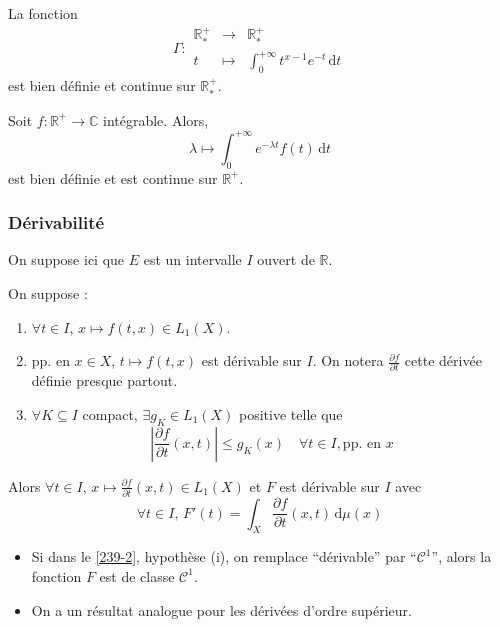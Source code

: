   \begin{example}
    \label{239-1}
    La fonction
    \[ \Gamma :
    \begin{array}{ccc}
      \mathbb{R}^+_* &\rightarrow& \mathbb{R}^+_* \\
      t &\mapsto& \int_{0}^{+\infty} t^{x-1} e^{-t} \, \mathrm{d}t
    \end{array}
    \]
    est bien définie et continue sur $\mathbb{R}^+_*$.
  \end{example}


  \begin{example}
    Soit $f : \mathbb{R}^+ \rightarrow \mathbb{C}$ intégrable. Alors,
    \[ \lambda \mapsto \int_0^{+\infty} e^{-\lambda t} f(t) \, \mathrm{d}t \]
    est bien définie et est continue sur $\mathbb{R}^+$.
  \end{example}

  \subsubsection{Dérivabilité}


  On suppose ici que $E$ est un intervalle $I$ ouvert de $\mathbb{R}$.

  \begin{theorem}
    \label{239-2}
    On suppose :
    \begin{enumerate}[label=(\roman*)]
      \item $\forall t \in I$, $x \mapsto f(t,x) \in L_1(X)$.
      \item pp. en $x \in X$, $t \mapsto f(t,x)$ est dérivable sur $I$. On notera $\frac{\partial f}{\partial t}$ cette dérivée définie presque partout.
      \item $\forall K \subseteq I$ compact, $\exists g_K \in L_1(X)$ positive telle que
      \[ \left| \frac{\partial f}{\partial t}(x,t) \right| \leq g_K(x) \quad \forall t \in I, \text{pp. en } x \]
    \end{enumerate}
    Alors $\forall t \in I$, $x \mapsto \frac{\partial f}{\partial t}(x, t) \in L_1(X)$ et $F$ est dérivable sur $I$ avec
    \[ \forall t \in I, \, F'(t) = \int_X \frac{\partial f}{\partial t}(x, t) \, \mathrm{d}\mu(x) \]
  \end{theorem}

  \begin{remark}
    \begin{itemize}
      \item Si dans le \cref{239-2}, hypothèse (i), on remplace ``dérivable'' par ``$\mathcal{C}^1$'', alors la fonction $F$ est de classe $\mathcal{C}^1$.
      \item On a un résultat analogue pour les dérivées d'ordre supérieur.
    \end{itemize}
  \end{remark}

